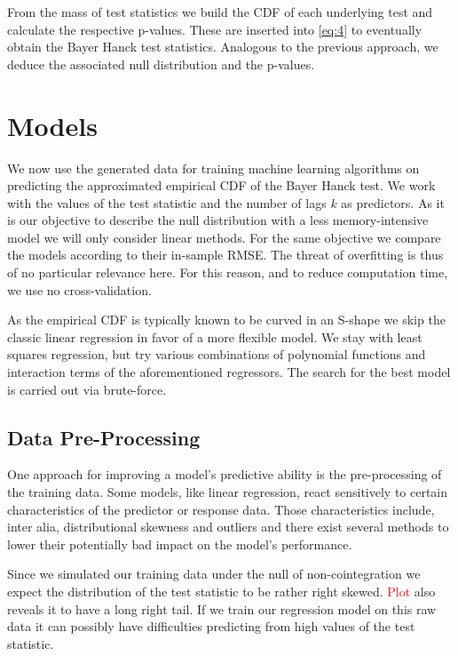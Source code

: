 \documentclass[12pt,a4paper]{article}
\begin{document}
From the mass of test statistics we build the \ac{CDF} of each
underlying test and calculate the respective p-values. These are
inserted into \eqref{eq:4} to eventually obtain the Bayer Hanck test
statistics. Analogous to the previous approach, we deduce the associated
null distribution and the p-values.

\hypertarget{models}{%
\section{Models}\label{models}}

We now use the generated data for training machine learning algorithms
on predicting the approximated empirical \ac{CDF} of the Bayer Hanck
test. We work with the values of the test statistic and the number of
lags \(k\) as predictors. As it is our objective to describe the null
distribution with a less memory-intensive model we will only consider
linear methods. For the same objective we compare the models according
to their in-sample \ac{RMSE}. The threat of overfitting is thus of no
particular relevance here. For this reason, and to reduce computation
time, we use no cross-validation.

As the empirical \ac{CDF} is typically known to be curved in an S-shape
we skip the classic linear regression in favor of a more flexible model.
We stay with least squares regression, but try various combinations of
polynomial functions and interaction terms of the aforementioned
regressors. The search for the best model is carried out via
brute-force.

\hypertarget{data-pre-processing}{%
\subsection{Data Pre-Processing}\label{data-pre-processing}}

One approach for improving a model's predictive ability is the
pre-processing of the training data. Some models, like linear
regression, react sensitively to certain characteristics of the
predictor or response data. Those characteristics include, inter alia,
distributional skewness and outliers and there exist several methods to
lower their potentially bad impact on the model's performance.

Since we simulated our training data under the null of non-cointegration
we expect the distribution of the test statistic to be rather right
skewed. \textcolor{red}{Plot} also reveals it to have a long right tail.
If we train our regression model on this raw data it can possibly have
difficulties predicting from high values of the test statistic.
\end{document}
